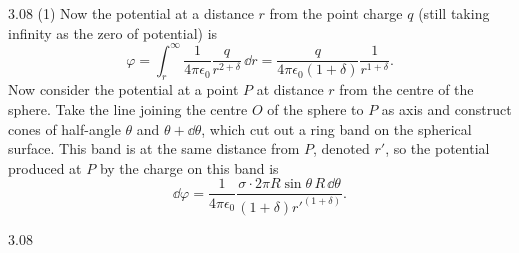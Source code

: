 \begin{solution}{3.08}
(1) Now the potential at a distance $r$ from the point charge $q$ (still taking infinity as the zero of potential) is
\[
\varphi=\int_r^\infty\frac{1}{4\pi\epsilon_0}\frac{q}{r^{2+\delta}}\,\dd r
=\frac{q}{4\pi\epsilon_0(1+\delta)}\frac{1}{r^{1+\delta}}.
\]
Now consider the potential at a point $P$ at distance $r$ from the centre of the sphere. Take the line joining the centre $O$ of the sphere to $P$ as axis and construct cones of half-angle $\theta$ and $\theta+\dd\theta$, which cut out a ring band on the spherical surface. This band is at the same distance from $P$, denoted $r'$, so the potential produced at $P$ by the charge on this band is
\[
\dd\varphi=\frac{1}{4\pi\epsilon_0}\frac{\sigma\cdot 2\pi R\sin\theta\,R\,\dd\theta}{(1+\delta)r'^{(1+\delta)}}.
\]

\begin{figbox}{3.08}
\end{figbox}


\end{solution}
